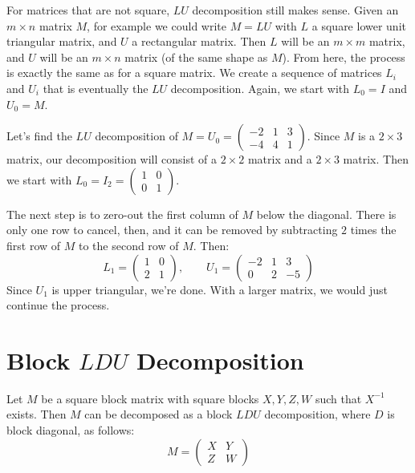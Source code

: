
For matrices that are not square, $LU$ decomposition still makes sense.  Given an $m\times n$ matrix $M$, for example we could write $M=LU$ with $L$ a square lower unit triangular matrix, and $U$ a rectangular matrix.  Then $L$ will be an $m\times m$ matrix, and $U$ will be an $m\times n$ matrix (of the same shape as $M$).  From here, the process is exactly the same as for a square matrix.  We create a sequence of matrices $L_i$ and $U_i$ that is eventually the $LU$ decomposition.  Again, we start with $L_0=I$ and $U_0=M$.

\begin{example}
Let's find the $LU$ decomposition of $M=U_0=\begin{pmatrix}
-2 & 1 & 3 \\
-4 & 4 & 1 
\end{pmatrix}$.  Since $M$ is a $2\times 3$ matrix, our decomposition will consist of a $2\times 2$ matrix and a $2\times 3$ matrix.  Then we start with $L_0=I_2=\begin{pmatrix}
1 & 0 \\
0 & 1
\end{pmatrix}$.

The next step is to zero-out the first column of $M$ below the diagonal.  There is only one row to cancel, then, and it can be removed by subtracting $2$ times the first row of $M$ to the second row of $M$.  Then:
\[
L_1=\begin{pmatrix}
1 & 0 \\
2 & 1
\end{pmatrix}, \qquad 
U_1 = \begin{pmatrix}
-2 & 1 & 3 \\
0 & 2 & -5 
\end{pmatrix}
\]
Since $U_1$ is upper triangular, we're done.  With a larger matrix, we would just continue the process.
\end{example}





\section{Block $LDU$ Decomposition}

Let $M$ be a square block matrix with square blocks $X,Y,Z,W$ such that $X^{-1}$ exists.  Then $M$ can be decomposed as a block $LDU$ decomposition, where $D$ is block diagonal, as follows:
\[
M=\begin{pmatrix}
X & Y \\
Z & W
\end{pmatrix}
\]

